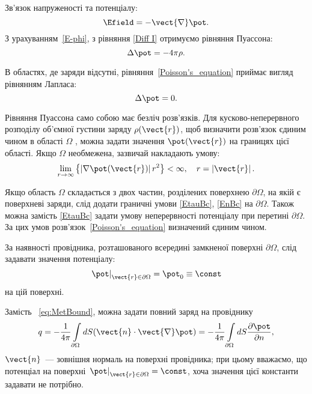 \begin{Theory}

	Зв'язок напруженості та потенціалу:
	\begin{equation}\label{E-phi}
		\Efield = - \vect{\nabla}\pot.
	\end{equation}
	З урахуванням~\eqref{E-phi}, з рівняння \eqref{Diff I}  отримуємо рівняння Пуассона:
	\begin{equation}\label{Poisson's_equation}
		\Delta\pot = -4\pi\rho.
	\end{equation}

	В областях, де заряди відсутні, рівняння~\eqref{Poisson's_equation} приймає вигляд рівнянням Лапласа:
	\begin{equation}\label{Laplace_equation}
		\Delta\pot = 0.
	\end{equation}

	Рівняння Пуассона само собою має безліч розв'язків. Для кусково-неперервного розподілу об’ємної густини заряду  $\rho(\vect{r})$, щоб визначити розв’язок єдиним чином в області $\Omega$ , можна задати значення $\pot(\vect{r})$  на границях цієї області. Якщо $\Omega$  необмежена, зазвичай накладають умову:
	\begin{equation}\label{eq:Efinity}
		\lim\limits_{r \to \infty } \left\{ {\left| {\nabla \pot({\vect{r}})} \right|{r^2}} \right\} < \infty ,\quad r = \left| {\vect{r}} \right|.
	\end{equation}

	Якщо область  $\Omega$ складається з двох частин, розділених поверхнею $\partial\Omega$, на якій є поверхневі заряди, слід додати граничні умови \eqref{EtauBc}, \eqref{EnBc} на $\partial\Omega$. Також можна замість \eqref{EtauBc} задати умову неперервності потенціалу при перетині $\partial\Omega$. За цих умов розв'язок~\eqref{Poisson's_equation} визначений єдиним чином.

	За наявності провідника, розташованого всередині замкненої поверхні $\partial\Omega$,  слід задавати значення потенціалу:
	\begin{equation}\label{eq:MetBound}
		\left. \pot  \right|_{\vect{r} \in \partial \Omega}  = \pot_0 \equiv \const
	\end{equation}
	на цій поверхні.

	Замість~ \eqref{eq:MetBound}, можна задати повний заряд на провіднику
	\begin{equation}\label{}
		q = -\frac{1}{4\pi}\int\limits_{\partial\Omega} dS (\vect{n}\cdot\vect{\nabla}\pot) =  -\frac{1}{4\pi}\int\limits_{\partial\Omega} dS \frac{\partial \pot}{\partial n},
	\end{equation}
    $\vect{n}$~---	зовнішня нормаль на поверхні провідника; при цьому вважаємо, що потенціал на поверхні $\left. \pot  \right|_{\vect{r} \in \partial \Omega}  = \const$, хоча значення цієї константи задавати не потрібно.



\end{Theory}
